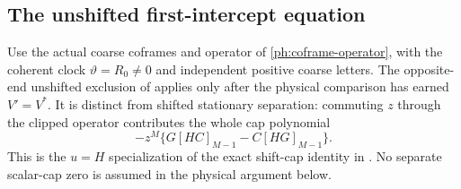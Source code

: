 \documentclass[11pt,a4paper]{amsart}
\numberwithin{equation}{section}
\theoremstyle{plain}
\theoremstyle{definition}
\begin{document}
\subsection{The unshifted first-intercept equation}

Use the actual coarse coframes and operator of
\eqref{ph:coframe-operator}, with the coherent clock
\(\vartheta=R_0\ne0\) and independent positive coarse letters.
The opposite-end unshifted exclusion of \cite{Shields2026Coframes}
applies only after the physical comparison has earned \(V'=V^*\).
It is distinct from shifted stationary separation: commuting \(z\)
through the clipped operator contributes the whole cap polynomial
\[
 -z^M\{G[HC]_{M-1}-C[HG]_{M-1}\}.
\]
This is the \(u=H\) specialization of the exact shift-cap identity
in \cite{Shields2026Coframes}.  No separate scalar-cap zero is assumed
in the physical argument below.
\end{document}

